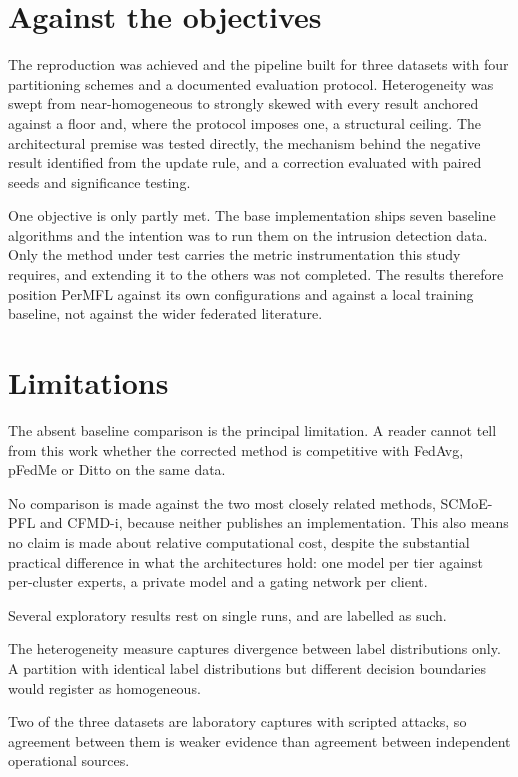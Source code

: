 \section{Against the objectives}
\label{sec:objectives-met}

The reproduction was achieved and the pipeline built for three datasets with
four partitioning schemes and a documented evaluation protocol. Heterogeneity
was swept from near-homogeneous to strongly skewed with every result anchored
against a floor and, where the protocol imposes one, a structural ceiling. The
architectural premise was tested directly, the mechanism behind the negative
result identified from the update rule, and a correction evaluated with paired
seeds and significance testing.

One objective is only partly met. The base implementation ships seven baseline
algorithms and the intention was to run them on the intrusion detection data.
Only the method under test carries the metric instrumentation this study
requires, and extending it to the others was not completed. The results
therefore position PerMFL against its own configurations and against a local
training baseline, not against the wider federated literature.

\section{Limitations}
\label{sec:limitations}

The absent baseline comparison is the principal limitation. A reader cannot tell
from this work whether the corrected method is competitive with FedAvg, pFedMe
or Ditto on the same data.

No comparison is made against the two most closely related methods, SCMoE-PFL
and CFMD-i, because neither publishes an implementation. This also means no
claim is made about relative computational cost, despite the substantial
practical difference in what the architectures hold: one model per tier against
per-cluster experts, a private model and a gating network per client.

Several exploratory results rest on single runs, and are labelled as such.

The heterogeneity measure captures divergence between label distributions only.
A partition with identical label distributions but different decision boundaries
would register as homogeneous.

Two of the three datasets are laboratory captures with scripted attacks, so
agreement between them is weaker evidence than agreement between independent
operational sources.

